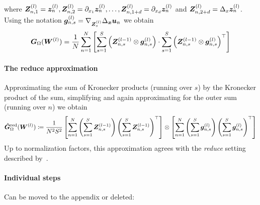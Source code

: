 where ${\bm{Z}}_{n, 1}^{(l)} = {\bm{z}}_n^{(l)}, {\bm{Z}}_{n, 2}^{(l)} = \partial_{x_1}{\bm{z}}_n^{(l)}, \dots, {\bm{Z}}_{n, 1+d}^{(l)} = \partial_{x_d}{\bm{z}}_n^{(l)}$ and ${\bm{Z}}_{n, 2+d}^{(l)} = \Delta_x{\bm{z}}_n^{(l)}$.
Using the notation
${\bm{g}}_{n, s}^{(l)} = \nabla_{{\bm{Z}}_{s}^{(l)}} \Delta_{\bm{x}}{\bm{u}}_n$ we obtain
\begin{equation}\label{eq:laplace_gramian_block_exact}
    {\bm{G}}_\Omega({\bm{W}}^{(l)}) 
    =
    \frac1N\sum_{n=1}^N
    \left[\sum_{s=1}^S \left( {\bm{Z}}^{(l-1)}_{n,s}\otimes {\bm{g}}_{n,s}^{(l)} \right)
    \cdot
    \sum_{s=1}^S \left( {\bm{Z}}
    ^{(l-1)}_{n,s}\otimes {\bm{g}}_{n,s}^{(l)} \right)^\top\right] 
\end{equation}

%

\paragraph{The reduce approximation}
Approximating the sum of Kronecker products (running over $s$) by the Kronecker product of the sum, simplifying and again approximating for the outer sum (running over $n$) we obtain
\begin{align}
    \hat{{\bm{G}}}_\Omega^{\textup{red}}({\bm{W}}^{(l)}) 
    \coloneqq
    \frac{1}{N^2 S^2} \left[\sum_{n=1}^N \left( \sum_{s=1}^S {\bm{Z}}^{(l-1)}_{n,s} \right) \left(\sum_{s=1}^S {{\bm{Z}}^{(l-1)}_{n,s}}\right)^\top\right]
    \otimes
    \left[\sum_{n=1}^N\left(\sum_{s=1}^S {\bm{g}}^{(l)}_{n,s} \right) \left( \sum_{s=1}^S {{\bm{g}}^{(l)}_{n,s}} \right)^\top \right] 
\end{align}
Up to normalization factors, this approximation agrees with the \emph{reduce} setting described by~\citet{eschenhagen2023kroneckerfactored}.

\paragraph{Individual steps} Can be moved to the appendix or deleted: 

